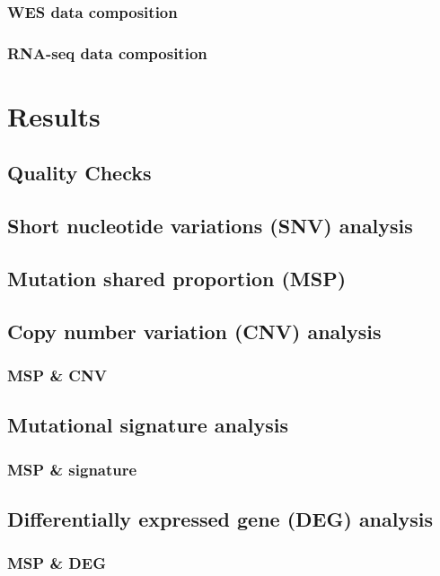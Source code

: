 \documentclass{beamer}
\begin{document}
        \begin{frame}
            \frametitle{WES data composition}
        \end{frame}

        \begin{frame}
            \frametitle{RNA-seq data composition}
        \end{frame}

    \section{Results}
        \subsection{Quality Checks}

        \subsection{Short nucleotide variations (SNV) analysis}

        \subsection{Mutation shared proportion (MSP)}

        \subsection{Copy number variation (CNV) analysis}
            \subsubsection{MSP \& CNV}

        \subsection{Mutational signature analysis}
            \subsubsection{MSP \& signature}

        \subsection{Differentially expressed gene (DEG) analysis}
            \subsubsection{MSP \& DEG}
\end{document}
